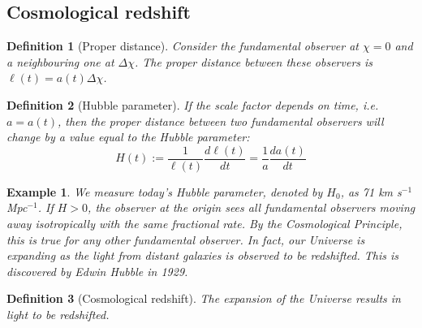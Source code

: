 \documentclass[a4paper]{article}
\newtheorem{eg}{Example}[section]
\theoremstyle{new}
\newtheorem{defi}{Definition}[section]
\begin{document}
\subsection{Cosmological redshift}
\begin{defi}[Proper distance]
Consider the fundamental observer at $\chi=0$ and a neighbouring one at $\Delta\chi$. The proper distance between these observers is $\ell(t)=a(t)\Delta\chi$.
\end{defi}
\begin{defi}[Hubble parameter]
If the scale factor depends on time, i.e. $a=a(t)$, then the proper distance between two fundamental observers will change by a value equal to the Hubble parameter:
\begin{equation}
H(t):=\frac{1}{\ell(t)}\frac{d\ell(t)}{dt}=\frac{1}{a}\frac{da(t)}{dt}\label{Hubble}
\end{equation}
\end{defi}
\begin{eg}
We measure today's Hubble parameter, denoted by $H_0$, as 71 km s$^{-1}$ Mpc$^{-1}$. If $H>0$, the observer at the origin sees all fundamental observers moving away isotropically with the same fractional rate. By the Cosmological Principle, this is true for any other fundamental observer. In fact, our Universe  is expanding as the light from distant galaxies is observed to be redshifted. This is discovered by Edwin Hubble in 1929.
\end{eg}
\begin{defi}[Cosmological redshift]
The expansion of the Universe results in light to be redshifted.
\end{defi}
\end{document}
